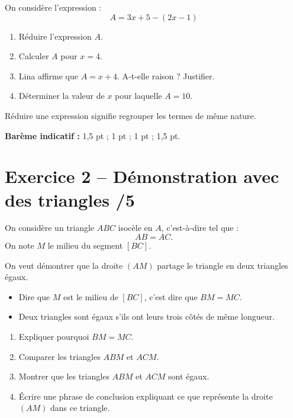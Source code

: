 \documentclass[11pt,a4paper]{article}
\begin{document}
On considère l'expression :
\[
A = 3x + 5 - (2x - 1)
\]

\begin{enumerate}[label=\textbf{\arabic*.}, leftmargin=1.2cm]
    \item Réduire l'expression \(A\).
    \item Calculer \(A\) pour \(x=4\).
    \item Lina affirme que \(A = x+4\). A-t-elle raison ? Justifier.
    \item Déterminer la valeur de \(x\) pour laquelle \(A=10\).
\end{enumerate}

\begin{tcolorbox}[title=Rappel utile]
Réduire une expression signifie regrouper les termes de même nature.
\end{tcolorbox}

\textbf{Barème indicatif :} 1,5 pt ; 1 pt ; 1 pt ; 1,5 pt.

\section*{Exercice 2 -- Démonstration avec des triangles \hfill /5}

On considère un triangle \(ABC\) isocèle en \(A\), c'est-à-dire tel que :
\[
AB = AC.
\]
On note \(M\) le milieu du segment \([BC]\).

On veut démontrer que la droite \((AM)\) partage le triangle en deux triangles égaux.

\begin{tcolorbox}[title=Rappels utiles]
\begin{itemize}[leftmargin=1.2cm]
    \item Dire que \(M\) est le milieu de \([BC]\), c'est dire que \(BM = MC\).
    \item Deux triangles sont égaux s'ils ont leurs trois côtés de même longueur.
\end{itemize}
\end{tcolorbox}

\begin{enumerate}[label=\textbf{\arabic*.}, leftmargin=1.2cm]
    \item Expliquer pourquoi \(BM = MC\).
    \item Comparer les triangles \(ABM\) et \(ACM\).
    \item Montrer que les triangles \(ABM\) et \(ACM\) sont égaux.
    \item Écrire une phrase de conclusion expliquant ce que représente la droite \((AM)\) dans ce triangle.
\end{enumerate}
\end{document}
